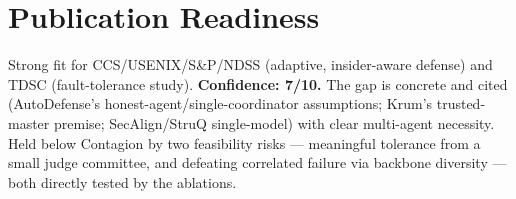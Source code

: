\documentclass[11pt]{article}
\begin{document}
\section*{Publication Readiness}
Strong fit for CCS/USENIX/S\&P/NDSS (adaptive, insider-aware defense) and TDSC (fault-tolerance study). \textbf{Confidence: 7/10.} The gap is concrete and cited (AutoDefense's honest-agent/single-coordinator assumptions; Krum's trusted-master premise; SecAlign/StruQ single-model) with clear multi-agent necessity. Held below Contagion by two feasibility risks --- meaningful tolerance from a small judge committee, and defeating correlated failure via backbone diversity --- both directly tested by the ablations.
\end{document}
